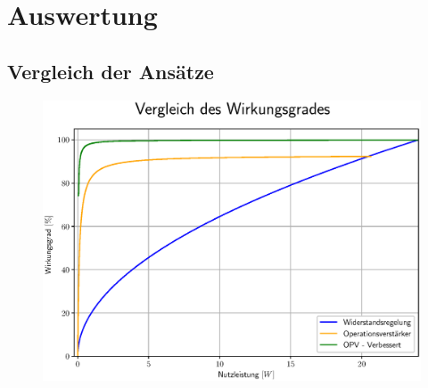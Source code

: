 \documentclass{beamer}
\begin{document}
	\section{Auswertung}
	\subsection{Vergleich der Ansätze}
	\begin{frame}
		\begin{center}
			\begin{figure}[tbh]
				\centering
				\includegraphics[width=0.95\linewidth]{medien/3.eps}
			\end{figure}
		\end{center}
	\end{frame}
\end{document}
